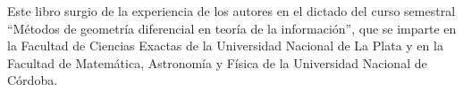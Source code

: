 Este  libro surgio  de la experiencia  de los  autores en el  dictado del
  curso semestral ``M\'etodos de geometr\'ia diferencial en teor\'ia de la
  informaci\'on'',  que se  imparte  en la  Facultad  de Ciencias  Exactas de  la
  Universidad  Nacional  de   La  Plata  y  en  la   Facultad  de  Matem\'atica,
  Astronom\'ia y F\'isica de la Universidad Nacional de C\'ordoba.  
